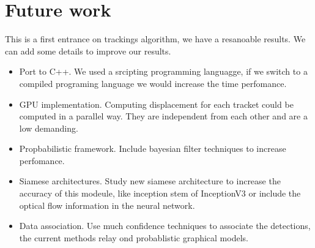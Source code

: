 \section{Future work}


This is a first entrance on trackings algorithm, we have a resanoable results. We can add some details to improve our results.


\begin{itemize}

\item Port to C++. We used a srcipting programming languagge, if we switch to a compiled programing language we would increase the time perfomance.

\item GPU implementation. Computing displacement for each tracket could be computed in a parallel way. They are independent from each other and are a low demanding. 

\item Propbabilistic framework. Include bayesian filter techniques to increase perfomance.

\item Siamese architectures. Study new siamese architecture to increase the accuracy of this modeule, like inception stem of InceptionV3 or include the optical flow information in the neural network.

\item Data association. Use much confidence techniques to associate the detections, the current methods relay ond probablistic graphical models.

\end{itemize}
